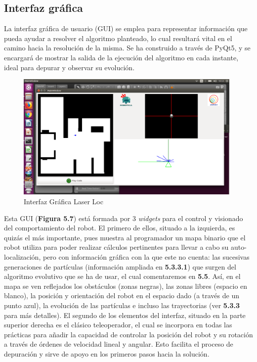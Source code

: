 \subsection{Interfaz gráfica}
La interfaz gráfica de usuario (GUI) se emplea para representar información que pueda ayudar a resolver el algoritmo planteado, lo cual resultará vital en el camino hacia la resolución de la misma. Se ha construido a través de PyQt5, y se encargará de mostrar la salida de la ejecución del algoritmo en cada instante, ideal para depurar y observar su evolución.

\begin{figure}[H]
  \begin{center}
    \includegraphics[width=0.98\textwidth]{figures/llgui.png}
		\caption{Interfaz Gráfica Laser Loc}
		\label{fig.llgui}
		\end{center}
\end{figure}

Esta GUI (\textbf{Figura 5.7}) está formada por 3 \textit{widgets} para el control y visionado del comportamiento del robot. El primero de ellos, situado a la izquierda, es quizás el más importante, pues muestra al programador un mapa binario que el robot utiliza para poder realizar cálculos pertinentes para llevar a cabo su auto-localización, pero con información gráfica con la que este no cuenta: las sucesivas generaciones de partículas (información ampliada en \textbf{5.3.3.1}) que surgen del algoritmo evolutivo que se ha de usar, el cual comentaremos en \textbf{5.5}. Así, en el mapa se ven reflejados los obstáculos (zonas negras), las zonas libres (espacio en blanco), la posición y orientación del robot en el espacio dado (a través de un punto azul), la evolución de las partículas e incluso las trayectorias (ver \textbf{5.3.3} para más detalles). 
El segundo de los elementos del interfaz, situado en la parte superior derecha es el clásico teleoperador, el cual se incorpora en todas las prácticas para añadir la capacidad de controlar la posición del robot y su rotación a través de órdenes de velocidad lineal y angular. Esto facilita el proceso de depuración y sirve de apoyo en los primeros pasos hacia la solución.

